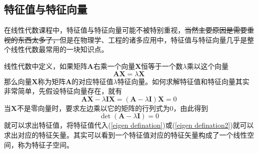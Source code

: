 \documentclass[12pt,a4paper,openany,twoside]{book}
\numberwithin{equation}{section}
\begin{document}
    \subsection{特征值与特征向量}
    在线性代数课程中，特征值与特征向量可能不被特别重视，\sout{当然主要原因是需要重视的东西太多了，}但是在物理学、工程的诸多应用中，特征值与特征向量几乎是整个线性代数最常用的一块知识点。

    线性代数中定义，如果矩阵$\mathbf{A}$右乘一个向量$\mathbf{X}$恒等于一个数$\lambda$乘以这个向量
    \begin{equation}
      \mathbf{AX}=\lambda\mathbf{X}
      \label{eigen defination}
    \end{equation}
    那么向量$\mathbf{X}$称为矩阵$\mathbf{A}$的对应特征值$\lambda$特征向量。如何求解特征值和特征向量其实非常简单，先假设特征向量存在，就有
    \begin{equation}
      \mathbf{AX}-\lambda\mathbf{I}\mathbf{X}=(\mathbf{A}-\lambda\mathbf{I})\mathbf{X}=0
      \label{eigen defination2}
    \end{equation}
    当$\mathbf{X}$不是零向量时，要求左边乘以它的矩阵的行列式为0，由此得到
    \begin{equation}
      \operatorname{det}(\mathbf{A}-\lambda\mathbf{I})=0
      \label{eigen equ}
    \end{equation}
    就可以求出特征值，将特征值代入(\ref{eigen defination})或(\ref{eigen defination2})就可以求出对应的特征矢量。其实可以看到一个特征值对应的特征矢量构成了一个线性空间，称为特征子空间。
\end{document}

